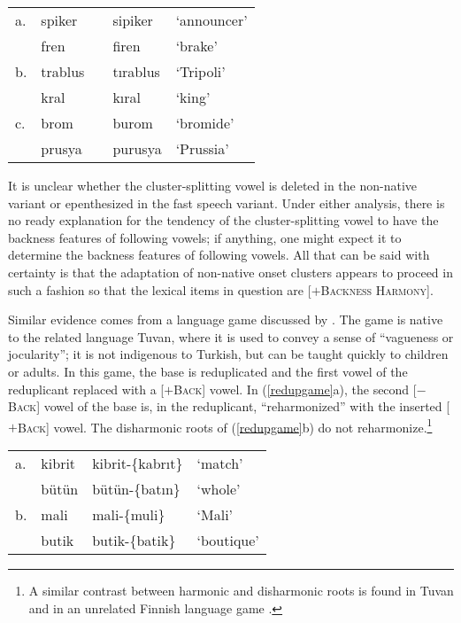 \begin{example} 
\begin{tabular}{lllll}
a. & {spiker}  & \alt{} & {sipiker}  & `announcer' \\
   & {fren}    & \alt{} & {firen}    & `brake'     \\
b. & {trablus} & \alt{} & {tırablus} & `Tripoli'   \\
   & {kral}    & \alt{} & {kıral}    & `king'      \\
c. & {brom}    & \alt{} & {burom}    & `bromide'   \\
   & {prusya}  & \alt{} & {purusya}  & `Prussia'   \\
\end{tabular}
\label{spiker}
\end{example}

\noindent
It is unclear whether the cluster-splitting vowel is deleted in the non-native variant or epenthesized in the fast speech variant. 
    Under either analysis, there is no ready explanation for the tendency of the cluster-splitting vowel to have the backness features of following vowels; if anything, one might expect it to determine the backness features of following vowels. 
    All that can be said with certainty is that the adaptation of non-native onset clusters appears to proceed in such a fashion so that the lexical items in question are [$+$\textsc{Backness Harmony}].

Similar evidence comes from a language game discussed by \citet{Harrison2001}. 
    The game is native to the related language Tuvan, where it is used to convey a sense of ``vagueness or jocularity''; it is not indigenous to Turkish, but can be taught quickly to children or adults. 
    In this game, the base is reduplicated and the first vowel of the reduplicant replaced with a [$+$\textsc{Back}] vowel. 
    In (\ref{redupgame}a), the second [$-$\textsc{Back}] vowel of the base is, in the reduplicant, ``reharmonized'' with the inserted [$+$\textsc{Back}] vowel. 
    The disharmonic roots of (\ref{redupgame}b) do not reharmonize.\footnote{
    A similar contrast between harmonic and disharmonic roots is found in Tuvan \citep{Harrison2001} and in an unrelated Finnish language game \citep{Campbell1986}.}

\begin{example} 
\label{redupgame}
\begin{tabular}{llll}
a. & {kibrit} & {kibrit}-\{{kabrıt}\} & `match'    \\
   & {bütün}  & {bütün}-\{{batın}\}   & `whole'    \\
b. & {mali}   & {mali}-\{{muli}\}     & `Mali'     \\
   & {butik}  & {butik}-\{{batik}\}   & `boutique' \\
\end{tabular}
\end{example}

